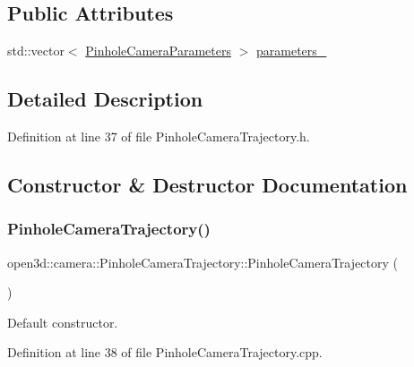 \subsection*{Public Attributes}
\begin{DoxyCompactItemize}
\item 
std\+::vector$<$ \mbox{\hyperlink{classopen3d_1_1camera_1_1_pinhole_camera_parameters}{Pinhole\+Camera\+Parameters}} $>$ \mbox{\hyperlink{classopen3d_1_1camera_1_1_pinhole_camera_trajectory_a97289c86dbb9c354c592cd741ecf4eea}{parameters\+\_\+}}
\end{DoxyCompactItemize}


\subsection{Detailed Description}


Definition at line 37 of file Pinhole\+Camera\+Trajectory.\+h.



\subsection{Constructor \& Destructor Documentation}
\mbox{\label{classopen3d_1_1camera_1_1_pinhole_camera_trajectory_a10142b8ed17053267fb537a792b8a63c}} 
\subsubsection{\texorpdfstring{PinholeCameraTrajectory()}{PinholeCameraTrajectory()}}
{\footnotesize\ttfamily open3d\+::camera\+::\+Pinhole\+Camera\+Trajectory\+::\+Pinhole\+Camera\+Trajectory (\begin{DoxyParamCaption}{ }\end{DoxyParamCaption})}



Default constructor. 



Definition at line 38 of file Pinhole\+Camera\+Trajectory.\+cpp.

\mbox{\label{classopen3d_1_1camera_1_1_pinhole_camera_trajectory_a345ace8fadf3ea020bf9002db8e539af}} 
